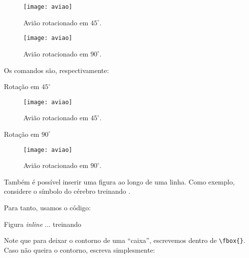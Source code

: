 \begin{figure}[!htbp]
	\centering
		\begin{minipage}[t]{0.48\linewidth}
			\begin{center}
				\texttt{[image: aviao]}
			\end{center}
					\caption{Avião rotacionado em $45^{\circ}$.}
					\label{fig:avi2}
		\end{minipage}
\hfill
		\begin{minipage}[t]{0.48\linewidth}
			\begin{center}
				\texttt{[image: aviao]}
			\end{center}
				\caption{Avião rotacionado em $90^{\circ}$.}
				\label{fig:avi3}
		\end{minipage}
\end{figure}

Os comandos são, respectivamente:

\begin{codigo}{Rotação em $45^{\circ}$}{\lapis}
\begin{figure}[!htbp]
\centering
\texttt{[image: aviao]}
\caption{Avião rotacionado em $45^{\circ}$.}
\label{fig:avi2}
\end{figure}
\end{codigo}

\begin{codigo}{Rotação em $90^{\circ}$}{\lapis}
\begin{figure}[!htbp]
\centering
\texttt{[image: aviao]}
\caption{Avião rotacionado em $90^{\circ}$.}
\label{fig:avi3}
\end{figure}
\end{codigo}

Também é possível inserir uma figura ao longo de uma linha.
Como exemplo, considere o símbolo do cérebro treinando .

Para tanto, usamos o código:

\begin{codigo}{Figura \textit{inline}}{\lapis}
... treinando 
\end{codigo}

Note que para deixar o contorno de uma ``caixa'', escrevemos dentro de 
\Verb|\fbox{}|.
Caso não queira o contorno, escreva simplesmente:



